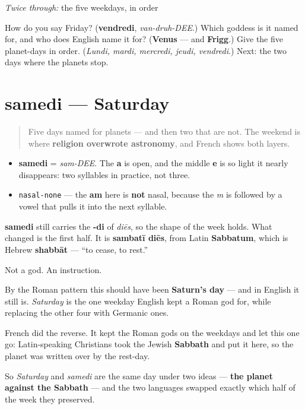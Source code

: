 \emph{Twice through:} the five weekdays, in order

\begin{tcolorbox}[breakable,colback=teal!4,colframe=teal!35!black,title={Before you move on}]
How do you say Friday? (\textbf{vendredi}, \emph{van-druh-DEE}.) Which goddess is it named for, and who does English name it for? (\textbf{Venus} — and \textbf{Frigg}.) Give the five planet-days in order. (\emph{Lundi, mardi, mercredi, jeudi, vendredi}.) Next: the two days where the planets stop.
\end{tcolorbox}
\section[samedi]{samedi — Saturday}

\label{lesson:FR-C07-samedi}



\begin{quote}
Five days named for planets — and then two that are not. The weekend is where \textbf{religion overwrote astronomy}, and French shows both layers.
\end{quote}

\begin{sounds}
\begin{itemize}
\raggedright
  \item \textbf{samedi} = \emph{sam-DEE}. The \textbf{a} is open, and the middle \textbf{e} is so light it nearly disappears: two syllables in practice, not three.
  \item \texttt{nasal-none} — the \textbf{am} here is \textbf{not} nasal, because the \emph{m} is followed by a vowel that pulls it into the next syllable.
\end{itemize}
\end{sounds}

\begin{cousinweb}
\textbf{samedi} still carries the \textbf{-di} of \emph{diēs}, so the shape of the week holds. What changed is the first half. It is \textbf{sambatī diēs}, from Latin \textbf{Sabbatum}, which is Hebrew \textbf{shabbāt} — \textquotedblleft{}to cease, to rest.\textquotedblright{}

Not a god. An instruction.
\end{cousinweb}

\begin{culture}
By the Roman pattern this should have been \textbf{Saturn's day} — and in English it still is. \emph{Saturday} is the one weekday English kept a Roman god for, while replacing the other four with Germanic ones.

French did the reverse. It kept the Roman gods on the weekdays and let this one go: Latin-speaking Christians took the Jewish \textbf{Sabbath} and put it here, so the planet was written over by the rest-day.

So \emph{Saturday} and \emph{samedi} are the same day under two ideas — \textbf{the planet against the Sabbath} — and the two languages swapped exactly which half of the week they preserved.
\end{culture}

